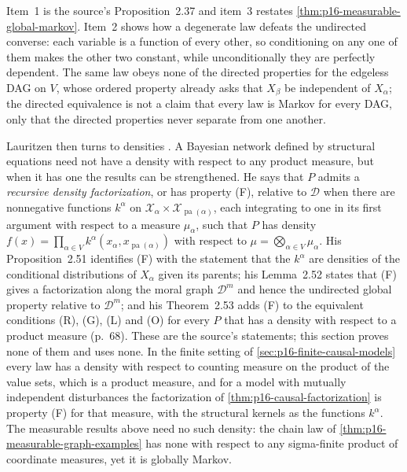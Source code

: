 Item~1 is the source's Proposition~2.37 and item~3 restates
\cref{thm:p16-measurable-global-markov}. Item~2 shows how a degenerate
law defeats the undirected converse: each variable is a function of
every other, so conditioning on any one of them makes the
other two constant, while unconditionally they are perfectly dependent.
The same law obeys none of the directed properties for the edgeless DAG
on \(V\), whose ordered property already asks that \(X_\beta\) be
independent of \(X_\alpha\); the directed equivalence is not a claim
that every law is Markov for every DAG, only that the directed
properties never separate from one another.

Lauritzen then turns to densities
\cite[p.~68]{Lauritzen2019GraphicalLectures2020}. A Bayesian network
defined by structural equations need not have a density with respect to
any product measure, but when it has one the results can be strengthened.
He says that \(P\) admits a \emph{recursive density factorization}, or
has property (F), relative to \(\mathcal D\) when there are nonnegative
functions \(k^\alpha\) on \(\mathcal X_\alpha\times
\mathcal X_{\operatorname{pa}(\alpha)}\), each integrating to one in its
first argument with respect to a measure \(\mu_\alpha\), such that \(P\)
has density \(f(x)=\prod_{\alpha\in V}k^\alpha(x_\alpha,x_{\operatorname{pa}(\alpha)})\)
with respect to \(\mu=\bigotimes_{\alpha\in V}\mu_\alpha\). His
Proposition~2.51 identifies (F) with the statement that the \(k^\alpha\)
are densities of the conditional distributions of \(X_\alpha\) given its
parents; his Lemma~2.52 states that (F) gives a factorization along the
moral graph \(\mathcal D^m\) and hence the undirected global property
relative to \(\mathcal D^m\); and his Theorem~2.53 adds (F) to the
equivalent conditions (R), (G), (L) and (O) for every \(P\) that has a
density with respect to a product measure (p.~68). These are the source's
statements; this section proves none of them and uses none. In the finite
setting of \cref{sec:p16-finite-causal-models} every law has a density
with respect to counting measure on the product of the value sets, which
is a product measure, and for a model with mutually independent
disturbances the factorization of \cref{thm:p16-causal-factorization} is
property (F) for that measure, with the structural kernels as the
functions \(k^\alpha\). The measurable results above need no such
density: the chain law of \cref{thm:p16-measurable-graph-examples} has
none with respect to any sigma-finite product of coordinate measures, yet
it is globally Markov.

